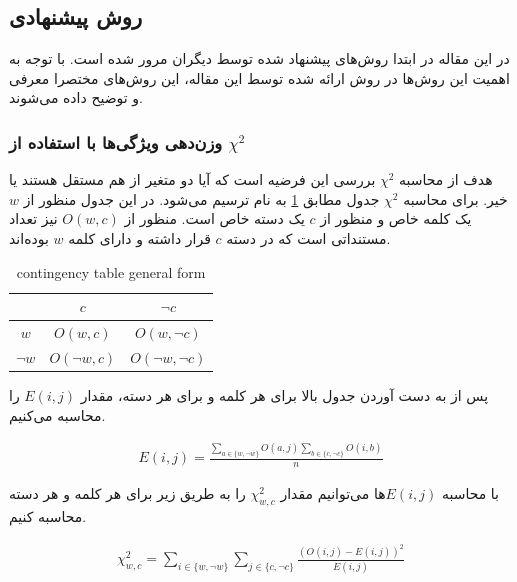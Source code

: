\documentclass[12pt, a4paper]{article}
\begin{document}
\subsection*{روش پیشنهادی}

در این مقاله در ابتدا روش‌های پیشنهاد شده توسط دیگران مرور شده است. با توجه به
اهمیت این روش‌ها در روش ارائه شده توسط این مقاله، این روش‌های مختصرا معرفی و
توضیح داده می‌شوند.

\subsubsection*{وزن‌دهی ویژگی‌ها با استفاده از $\chi^2$}

هدف از محاسبه $\chi^2$ بررسی این فرضیه است که آیا دو متغیر از هم مستقل هستند
یا خیر. برای محاسبه $\chi^2$ جدول مطابق \ref{contingency_table} به نام
 ترسیم می‌شود. در این جدول منظور از $w$ یک کلمه
خاص و منظور از $c$ یک دسته خاص است. منظور از $O(w, c)$ نیز تعداد مستنداتی
است که در دسته $c$ قرار داشته و دارای کلمه $w$ بوده‌اند.

\begin{latin}
\begin{table}[h]
    \centering
    \caption{contingency table general form}
    \label{contingency_table}
    \begin{tabular}{c|c|c}
                 & $c$            & $\lnot c$  \\
        \hline
        $w$ & $O(w, c)$ & $O(w, \lnot c)$ \\
        $\lnot w$ & $O(\lnot w, c)$ & $O(\lnot w, \lnot c)$ \\
    \end{tabular}
\end{table}
\end{latin}

پس از به دست آوردن جدول بالا برای هر کلمه و برای هر دسته، مقدار $E(i, j)$
را محاسبه می‌کنیم.

\begin{eqnarray}
    E(i,j) = \frac{\sum_{a \in \{w, \lnot w \}}O(a, j)\sum_{b\in\{c, \lnot c\}}O(i, b)}{n}
\end{eqnarray}

با محاسبه $E(i,j)$ها می‌توانیم مقدار $\chi_{w, c}^2$ را به طریق زیر
برای هر کلمه و هر دسته محاسبه کنیم.

\begin{eqnarray}
    \chi_{w, c}^2 = \sum_{i \in \{w, \lnot w\}}\sum_{j \in \{c, \lnot c\}} \frac{(O(i,j) - E(i,j))^2}{E(i,j)}
\end{eqnarray}
\end{document}
